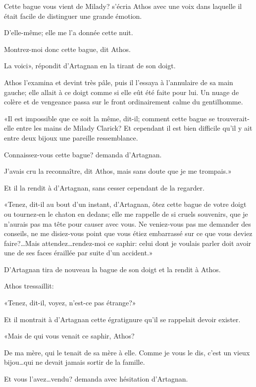 \speak  Cette bague vous vient de Milady? s'écria Athos avec une voix dans laquelle il était facile de distinguer une grande émotion. 

\speak  D'elle-même; elle me l'a donnée cette nuit. 

\speak  Montrez-moi donc cette bague, dit Athos. 

\speak  La voici», répondit d'Artagnan en la tirant de son doigt. 

Athos l'examina et devint très pâle, puis il l'essaya à l'annulaire de sa main gauche; elle allait à ce doigt comme si elle eût été faite pour lui. Un nuage de colère et de vengeance passa sur le front ordinairement calme du gentilhomme. 

«Il est impossible que ce soit la même, dit-il; comment cette bague se trouverait-elle entre les mains de Milady Clarick? Et cependant il est bien difficile qu'il y ait entre deux bijoux une pareille ressemblance. 

\speak  Connaissez-vous cette bague? demanda d'Artagnan. 

\speak  J'avais cru la reconnaître, dit Athos, mais sans doute que je me trompais.» 

Et il la rendit à d'Artagnan, sans cesser cependant de la regarder. 

«Tenez, dit-il au bout d'un instant, d'Artagnan, ôtez cette bague de votre doigt ou tournez-en le chaton en dedans; elle me rappelle de si cruels souvenirs, que je n'aurais pas ma tête pour causer avec vous. Ne veniez-vous pas me demander des conseils, ne me disiez-vous point que vous étiez embarrassé sur ce que vous deviez faire?\dots Mais attendez\dots rendez-moi ce saphir: celui dont je voulais parler doit avoir une de ses faces éraillée par suite d'un accident.» 

D'Artagnan tira de nouveau la bague de son doigt et la rendit à Athos. 

Athos tressaillit: 

«Tenez, dit-il, voyez, n'est-ce pas étrange?» 

Et il montrait à d'Artagnan cette égratignure qu'il se rappelait devoir exister. 

«Mais de qui vous venait ce saphir, Athos? 

\speak  De ma mère, qui le tenait de sa mère à elle. Comme je vous le dis, c'est un vieux bijou\dots qui ne devait jamais sortir de la famille. 

\speak  Et vous l'avez\dots vendu? demanda avec hésitation d'Artagnan. 

